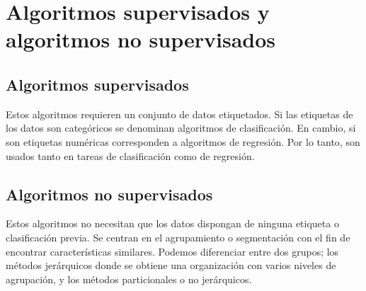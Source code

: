 \section{Algoritmos supervisados y algoritmos no supervisados}

\subsection{Algoritmos supervisados}
Estos algoritmos requieren un conjunto de datos etiquetados. Si las etiquetas de los datos son categóricos se denominan algoritmos de clasificación. En cambio, si son etiquetas numéricas corresponden a algoritmos de regresión. Por lo tanto, son usados tanto en tareas de clasificación como de regresión.

\subsection{Algoritmos no supervisados}
Estos algoritmos no necesitan que los datos dispongan de ninguna etiqueta o clasificación previa. Se centran en el agrupamiento o segmentación con el fin de encontrar características  similares. Podemos diferenciar entre  dos grupos; los métodos jerárquicos donde se obtiene una organización con varios niveles de agrupación, y los métodos particionales o no jerárquicos.
